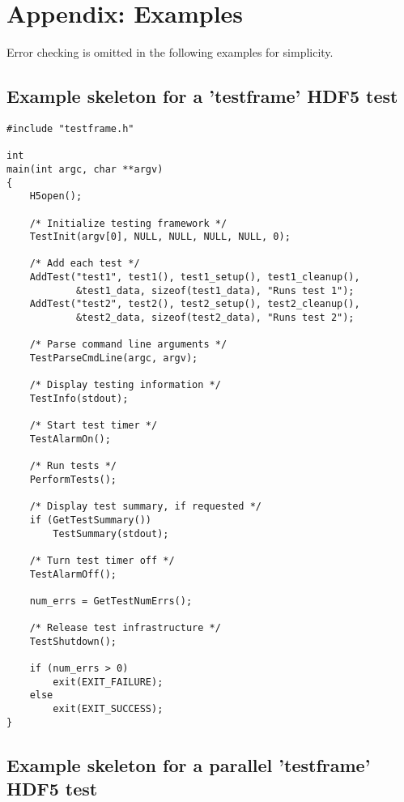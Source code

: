 \documentclass[../HDF5_RFC.tex]{subfiles}
\begin{document}
\newpage

\section{Appendix: Examples}
\label{apdx:examples}

Error checking is omitted in the following examples for simplicity.

\subsection{\textbf{Example skeleton for a 'testframe' HDF5 test}}
\label{apdx:testframe_example}

\begin{verbatim}
#include "testframe.h"

int
main(int argc, char **argv)
{
    H5open();

    /* Initialize testing framework */
    TestInit(argv[0], NULL, NULL, NULL, NULL, 0);

    /* Add each test */
    AddTest("test1", test1(), test1_setup(), test1_cleanup(),
            &test1_data, sizeof(test1_data), "Runs test 1");
    AddTest("test2", test2(), test2_setup(), test2_cleanup(),
            &test2_data, sizeof(test2_data), "Runs test 2");

    /* Parse command line arguments */
    TestParseCmdLine(argc, argv);

    /* Display testing information */
    TestInfo(stdout);

    /* Start test timer */
    TestAlarmOn();

    /* Run tests */
    PerformTests();

    /* Display test summary, if requested */
    if (GetTestSummary())
        TestSummary(stdout);

    /* Turn test timer off */
    TestAlarmOff();

    num_errs = GetTestNumErrs();

    /* Release test infrastructure */
    TestShutdown();

    if (num_errs > 0)
        exit(EXIT_FAILURE);
    else
        exit(EXIT_SUCCESS);
}
\end{verbatim}

\subsection{\textbf{Example skeleton for a parallel 'testframe' HDF5 test}}
\label{apdx:testframe_parallel_example}
\end{document}
